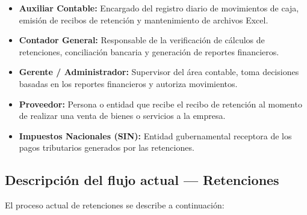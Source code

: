 \documentclass[stu]{apa7}
\begin{document}
\begin{itemize}
    \item \textbf{Auxiliar Contable:} Encargado del registro diario de movimientos de caja, emisión de recibos de retención y mantenimiento de archivos Excel.

    \item \textbf{Contador General:} Responsable de la verificación de cálculos de retenciones, conciliación bancaria y generación de reportes financieros.

    \item \textbf{Gerente / Administrador:} Supervisor del área contable, toma decisiones basadas en los reportes financieros y autoriza movimientos.

    \item \textbf{Proveedor:} Persona o entidad que recibe el recibo de retención al momento de realizar una venta de bienes o servicios a la empresa.

    \item \textbf{Impuestos Nacionales (SIN):} Entidad gubernamental receptora de los pagos tributarios generados por las retenciones.
\end{itemize}

\subsection{Descripción del flujo actual --- Retenciones}

El proceso actual de retenciones se describe a continuación:
\end{document}
